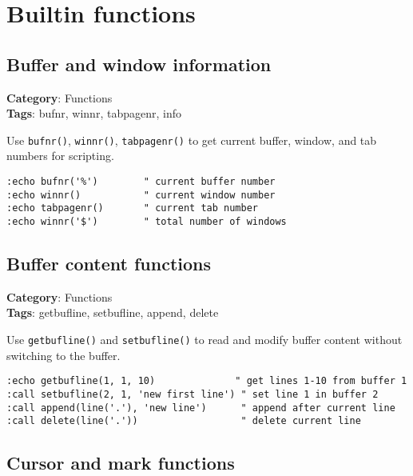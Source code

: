 {\chapter{Builtin functions}
\section{Buffer and window information}

\textbf{Category}: Functions\\ \textbf{Tags}: bufnr, winnr, tabpagenr, info
\vspace{0.5cm}

Use {\footnotesize \Verb§bufnr()§}, {\footnotesize \Verb§winnr()§}, {\footnotesize \Verb§tabpagenr()§} to get current buffer, window, and tab numbers for scripting.

\begin{Exa*}{}
\begin{Verbatim}[fontsize=\footnotesize, breaklines, breakanywhere]
:echo bufnr('%')        " current buffer number
:echo winnr()           " current window number
:echo tabpagenr()       " current tab number
:echo winnr('$')        " total number of windows
\end{Verbatim}
\end{Exa*}

\section{Buffer content functions}

\textbf{Category}: Functions\\ \textbf{Tags}: getbufline, setbufline, append, delete
\vspace{0.5cm}

Use {\footnotesize \Verb§getbufline()§} and {\footnotesize \Verb§setbufline()§} to read and modify buffer content without switching to the buffer.

\begin{Exa*}{}
\begin{Verbatim}[fontsize=\footnotesize, breaklines, breakanywhere]
:echo getbufline(1, 1, 10)              " get lines 1-10 from buffer 1
:call setbufline(2, 1, 'new first line') " set line 1 in buffer 2
:call append(line('.'), 'new line')      " append after current line
:call delete(line('.'))                  " delete current line
\end{Verbatim}
\end{Exa*}

\section{Cursor and mark functions}

}
